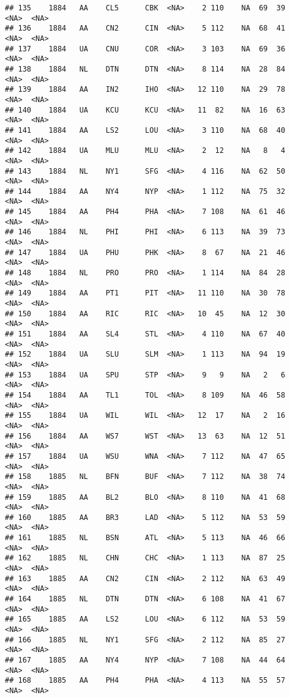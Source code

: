 \documentclass[]{article}
\begin{document}
\begin{verbatim}
## 135    1884   AA    CL5      CBK  <NA>    2 110    NA  69  39   <NA>  <NA>
## 136    1884   AA    CN2      CIN  <NA>    5 112    NA  68  41   <NA>  <NA>
## 137    1884   UA    CNU      COR  <NA>    3 103    NA  69  36   <NA>  <NA>
## 138    1884   NL    DTN      DTN  <NA>    8 114    NA  28  84   <NA>  <NA>
## 139    1884   AA    IN2      IHO  <NA>   12 110    NA  29  78   <NA>  <NA>
## 140    1884   UA    KCU      KCU  <NA>   11  82    NA  16  63   <NA>  <NA>
## 141    1884   AA    LS2      LOU  <NA>    3 110    NA  68  40   <NA>  <NA>
## 142    1884   UA    MLU      MLU  <NA>    2  12    NA   8   4   <NA>  <NA>
## 143    1884   NL    NY1      SFG  <NA>    4 116    NA  62  50   <NA>  <NA>
## 144    1884   AA    NY4      NYP  <NA>    1 112    NA  75  32   <NA>  <NA>
## 145    1884   AA    PH4      PHA  <NA>    7 108    NA  61  46   <NA>  <NA>
## 146    1884   NL    PHI      PHI  <NA>    6 113    NA  39  73   <NA>  <NA>
## 147    1884   UA    PHU      PHK  <NA>    8  67    NA  21  46   <NA>  <NA>
## 148    1884   NL    PRO      PRO  <NA>    1 114    NA  84  28   <NA>  <NA>
## 149    1884   AA    PT1      PIT  <NA>   11 110    NA  30  78   <NA>  <NA>
## 150    1884   AA    RIC      RIC  <NA>   10  45    NA  12  30   <NA>  <NA>
## 151    1884   AA    SL4      STL  <NA>    4 110    NA  67  40   <NA>  <NA>
## 152    1884   UA    SLU      SLM  <NA>    1 113    NA  94  19   <NA>  <NA>
## 153    1884   UA    SPU      STP  <NA>    9   9    NA   2   6   <NA>  <NA>
## 154    1884   AA    TL1      TOL  <NA>    8 109    NA  46  58   <NA>  <NA>
## 155    1884   UA    WIL      WIL  <NA>   12  17    NA   2  16   <NA>  <NA>
## 156    1884   AA    WS7      WST  <NA>   13  63    NA  12  51   <NA>  <NA>
## 157    1884   UA    WSU      WNA  <NA>    7 112    NA  47  65   <NA>  <NA>
## 158    1885   NL    BFN      BUF  <NA>    7 112    NA  38  74   <NA>  <NA>
## 159    1885   AA    BL2      BLO  <NA>    8 110    NA  41  68   <NA>  <NA>
## 160    1885   AA    BR3      LAD  <NA>    5 112    NA  53  59   <NA>  <NA>
## 161    1885   NL    BSN      ATL  <NA>    5 113    NA  46  66   <NA>  <NA>
## 162    1885   NL    CHN      CHC  <NA>    1 113    NA  87  25   <NA>  <NA>
## 163    1885   AA    CN2      CIN  <NA>    2 112    NA  63  49   <NA>  <NA>
## 164    1885   NL    DTN      DTN  <NA>    6 108    NA  41  67   <NA>  <NA>
## 165    1885   AA    LS2      LOU  <NA>    6 112    NA  53  59   <NA>  <NA>
## 166    1885   NL    NY1      SFG  <NA>    2 112    NA  85  27   <NA>  <NA>
## 167    1885   AA    NY4      NYP  <NA>    7 108    NA  44  64   <NA>  <NA>
## 168    1885   AA    PH4      PHA  <NA>    4 113    NA  55  57   <NA>  <NA>

\end{verbatim}
\end{document}
